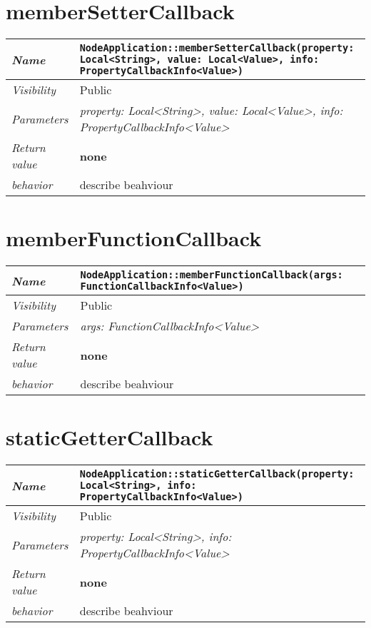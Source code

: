  \section{memberSetterCallback}
\begin{longtable}{p{3cm} @{\hskip 1cm} p{12cm}}
 \hline
\textit{Name} & \texttt{NodeApplication::memberSetterCallback(property: Local<String>, value: Local<Value>, info: PropertyCallbackInfo<Value>)}\\
\hline
 \textit{Visibility} & Public \\
\hline
\textit{Parameters} & \textit{property: Local<String>, value: Local<Value>, info: PropertyCallbackInfo<Value>}\\
\hline
\textit{Return value} & \textbf{none}\\
  \hline
 \textit{behavior} & describe beahviour \\
\hline
\end{longtable} \pagebreak
 \section{memberFunctionCallback}
\begin{longtable}{p{3cm} @{\hskip 1cm} p{12cm}}
 \hline
\textit{Name} & \texttt{NodeApplication::memberFunctionCallback(args: FunctionCallbackInfo<Value>)}\\
\hline
 \textit{Visibility} & Public \\
\hline
\textit{Parameters} & \textit{args: FunctionCallbackInfo<Value>}\\
\hline
\textit{Return value} & \textbf{none}\\
  \hline
 \textit{behavior} & describe beahviour \\
\hline
\end{longtable} \pagebreak
 \section{staticGetterCallback}
\begin{longtable}{p{3cm} @{\hskip 1cm} p{12cm}}
 \hline
\textit{Name} & \texttt{NodeApplication::staticGetterCallback(property: Local<String>, info: PropertyCallbackInfo<Value>)}\\
\hline
 \textit{Visibility} & Public \\
\hline
\textit{Parameters} & \textit{property: Local<String>, info: PropertyCallbackInfo<Value>}\\
\hline
\textit{Return value} & \textbf{none}\\
  \hline
 \textit{behavior} & describe beahviour \\
\hline
\end{longtable} \pagebreak
